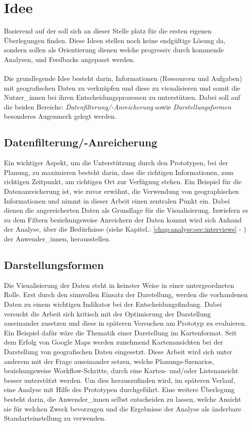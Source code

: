 \documentclass[Bachelorarbeit.tex]{subfiles}
\begin{document}
\section{Idee}
\label{chap:einfuehrung:sec:idee}

Basierend auf der  soll sich an dieser Stelle platz für die ersten eigenen Überlegungen finden. 
Diese Ideen stellen noch keine endgültige Lösung da, sondern sollen als Orientierung dienen welche progressiv durch kommende Analysen,  und Feedbacks angepasst werden.\\
\\
Die grundlegende Idee besteht darin, Informationen (Ressourcen und Aufgaben) mit geografischen Daten zu verknüpfen und diese zu visualisieren und somit die Nutzer\_innen bei ihren Entscheidungsprozessen zu unterstützen. 
Dabei soll auf die beiden Bereiche: \textit{Datenfilterung/-Anreicherung} sowie \textit{Darstellungsformen} besonderes Augenmerk gelegt werden.

\subsection*{Datenfilterung/-Anreicherung}
Ein wichtiger Aspekt, um die Unterstützung durch den Prototypen, bei der Planung, zu maximieren besteht darin, dass die richtigen Informationen, zum richtigen Zeitpunkt, am richtigen Ort zur Verfügung stehen. 
Ein Beispiel für die Datenanreicherung ist, wie zuvor erwähnt, die Verwendung von geographischen Informationen und nimmt in dieser Arbeit einen zentralen Punkt ein. 
Dabei dienen die angereicherten Daten als Grundlage für die Visualisierung.
Inwiefern es zu dem Filtern beziehungsweise Anreichern der Daten kommt wird sich Anhand der Analyse, über die Bedürfnisse (siehe Kapitel.: \ref{chap:analyse:sec:interviews} - ) der Anwender\_innen, herausstellen.

\subsection*{Darstellungsformen}
Die Visualisierung der Daten steht in keinster Weise in einer untergeordneten Rolle.
Erst durch den sinnvollen Einsatz der Darstellung, werden die vorhandenen Daten zu einem wichtigen Indikator bei der Entscheidungsfindung.
Dabei versucht die Arbeit sich kritisch mit der Optimierung der Darstellung auseinander zusetzen und diese in späteren Versuchen am Prototyp zu evaluieren.
Ein Beispiel dafür wäre die Thematik einer Darstellung im Kartenformat.
Seit dem Erfolg von Google Maps werden zunehmend Kartenansichten bei der Darstellung von geografischen Daten eingesetzt. 
Diese Arbeit wird sich unter anderem mit der Frage auseinander setzen, welche Planungs-Szenarios, beziehungsweise Workflow-Schritte, durch eine Karten- und/oder Listenansicht besser unterstützt werden.
Um dies herauszufinden wird, im späteren Verlauf, eine Analyse mit Hilfe des Prototypen durchgeführt.
Eine weitere Überlegung besteht darin, die Anwender\_innen selbst entscheiden zu lassen, welche Ansicht sie für welchen Zweck bevorzugen und die Ergebnisse der Analyse als änderbare Standarteinstellung zu verwenden.
\end{document}
